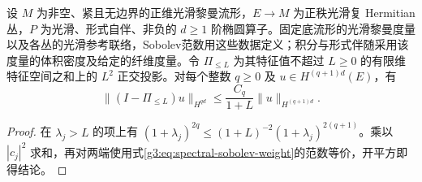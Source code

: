 \begin{corollary}\label{g3:cor:spectral-truncation-error}
	设 \(M\) 为非空、紧且无边界的正维光滑黎曼流形，\(E\to M\) 为正秩光滑复 Hermitian 丛，\(P\) 为光滑、形式自伴、非负的 \(d\ge1\) 阶椭圆算子。固定底流形的光滑黎曼度量以及各丛的光滑参考联络，Sobolev范数用这些数据定义；积分与形式伴随采用该度量的体积密度及给定的纤维度量。令 \(\Pi_{\le L}\) 为其特征值不超过 \(L\ge0\) 的有限维特征空间之和上的 \(L^2\) 正交投影。对每个整数 \(q\ge0\) 及 \(u\in H^{(q+1)d}(E)\)，有
	\[
		\|(I-\Pi_{\le L})u\|_{H^{qd}}
		\le\frac{C_q}{1+L}\|u\|_{H^{(q+1)d}}.
	\]
\end{corollary}
\begin{proof}
	在 \(\lambda_j>L\) 的项上有
	\((1+\lambda_j)^{2q}\le(1+L)^{-2}(1+\lambda_j)^{2(q+1)}\)。乘以 \(|c_j|^2\) 求和，再对两端使用式\eqref{g3:eq:spectral-sobolev-weight}的范数等价，开平方即得结论。
\end{proof}
